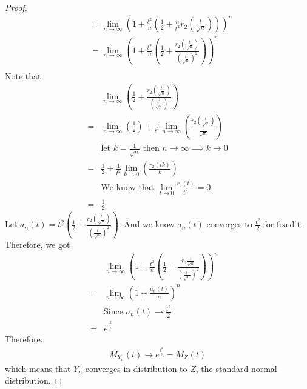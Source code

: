 \documentclass[11pt,oneside]{book}
\theoremstyle{break}
\theoremstyle{break}
\begin{document}
\begin{proof}
\begin{align*}
&=\lim_{n\to \infty}\left( 1+\frac{t^2}{n}\left(\frac{1}{2}+\frac{n}{t^2}r_2\left(\frac{t}{\sqrt{n}}\right) \right)\right)^n\\
&=\lim_{n\to \infty}\left( 1+\frac{t^2}{n}\left(\frac{1}{2}+\frac{r_2\left(\frac{t}{\sqrt{n}}\right)}{\left(\frac{t}{\sqrt{n}}\right)^2} \right)\right)^n\\
\end{align*}
Note that \begin{align*}
&\lim_{n\to \infty}\left(\frac{1}{2}+\frac{r_2\left(\frac{t}{\sqrt{n}}\right)}{\left(\frac{t^2}{\sqrt{n}}\right)} \right)\\
=&\lim_{n\to \infty}\left(\frac{1}{2} \right)+\frac{1}{t^2}\lim_{n\to \infty}\left( \frac{r_2\left( \frac{t}{\sqrt{n}}\right) }{\frac{1}{\sqrt{n}}}\right)\\
&\text{let }k=\frac{1}{\sqrt{n}}\text{ then }n\to \infty \implies k\to 0\\
=&\frac{1}{2}+\frac{1}{t^2}\lim_{k\to 0}\left(\frac{r_2(tk)}{k} \right)\\
& \text{We know that }\lim_{t\to 0}\frac{r_2(t)}{t^2}=0\\
=&\frac{1}{2}
\end{align*}
Let $a_n(t)=t^2\left(\frac{1}{2} +\frac{r_2\left(\frac{t}{\sqrt{n}} \right)}{\left( \frac{t}{\sqrt{n}}\right)^2}\right)$.  And we know $a_n(t)$ converges to $\frac{t^2}{2}$ for fixed t.\\
Therefore, we got\begin{align*}
&\lim_{n\to \infty}\left(1+\frac{t^2}{n}\left(\frac{1}{2}+\frac{r_2\frac{t}{\sqrt{n}}}{\left( \frac{t}{\sqrt{n}}\right)^2} \right)\right)^n \\
=&\lim_{n\to \infty}\left(1+\frac{a_n(t)}{n}\right)^n&\\
&\text{Since }a_n(t) \rightarrow \frac{t^2}{2}\\
=&e^{\frac{t^2}{2}}
\end{align*}
Therefore, \begin{align*}
M_{Y_n}(t) \longrightarrow e^{\frac{t^2}{2}}=M_Z(t)
\end{align*}
which means that $Y_n$ converges in distribution to $Z$, the standard normal distribution.
\end{proof}
\hfill\\
\end{document}
